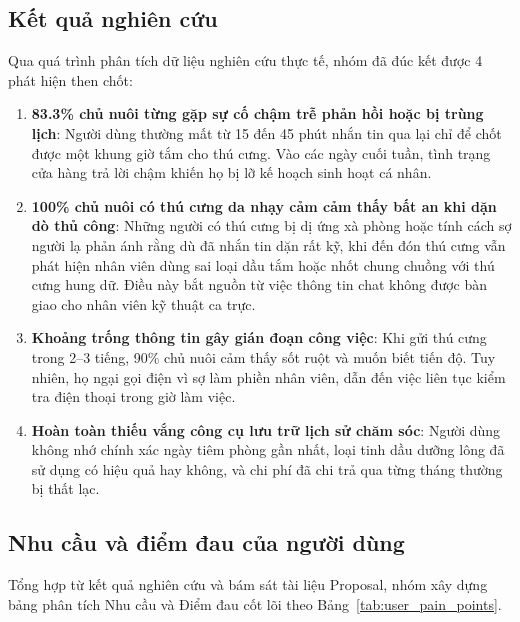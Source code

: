 \subsection{Kết quả nghiên cứu}
Qua quá trình phân tích dữ liệu nghiên cứu thực tế, nhóm đã đúc kết được 4 phát hiện then chốt:
\begin{enumerate}
    \item \textbf{83.3\% chủ nuôi từng gặp sự cố chậm trễ phản hồi hoặc bị trùng lịch}: Người dùng thường mất từ 15 đến 45 phút nhắn tin qua lại chỉ để chốt được một khung giờ tắm cho thú cưng. Vào các ngày cuối tuần, tình trạng cửa hàng trả lời chậm khiến họ bị lỡ kế hoạch sinh hoạt cá nhân.
    \item \textbf{100\% chủ nuôi có thú cưng da nhạy cảm cảm thấy bất an khi dặn dò thủ công}: Những người có thú cưng bị dị ứng xà phòng hoặc tính cách sợ người lạ phản ánh rằng dù đã nhắn tin dặn rất kỹ, khi đến đón thú cưng vẫn phát hiện nhân viên dùng sai loại dầu tắm hoặc nhốt chung chuồng với thú cưng hung dữ. Điều này bắt nguồn từ việc thông tin chat không được bàn giao cho nhân viên kỹ thuật ca trực.
    \item \textbf{Khoảng trống thông tin gây gián đoạn công việc}: Khi gửi thú cưng trong 2--3 tiếng, 90\% chủ nuôi cảm thấy sốt ruột và muốn biết tiến độ. Tuy nhiên, họ ngại gọi điện vì sợ làm phiền nhân viên, dẫn đến việc liên tục kiểm tra điện thoại trong giờ làm việc.
    \item \textbf{Hoàn toàn thiếu vắng công cụ lưu trữ lịch sử chăm sóc}: Người dùng không nhớ chính xác ngày tiêm phòng gần nhất, loại tinh dầu dưỡng lông đã sử dụng có hiệu quả hay không, và chi phí đã chi trả qua từng tháng thường bị thất lạc.
\end{enumerate}

\subsection{Nhu cầu và điểm đau của người dùng}
Tổng hợp từ kết quả nghiên cứu và bám sát tài liệu Proposal, nhóm xây dựng bảng phân tích Nhu cầu và Điểm đau cốt lõi theo Bảng~\ref{tab:user_pain_points}.

